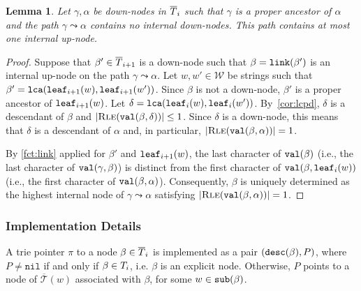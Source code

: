 \documentclass[a4paper]{article}
\newtheorem{lemma}[theorem]{Lemma}
\theoremstyle{remark}
\newcommand{\rle}{\textsc{Rle}}
\newcommand{\ustree}{\mathcal{\overline{T}}}
\newcommand{\coll}{\mathcal{W}}
\newcommand{\itnil}{\mathtt{nil}}
\begin{document}
\begin{lemma}\label{lem:oneup}
Let $\gamma,\alpha$ be down-nodes in $\overline{T}_i$ such that $\gamma$ is a proper ancestor of $\alpha$
and the path $\gamma \leadsto \alpha$ contains no internal down-nodes.
This path contains at most one internal up-node.
\end{lemma}
\begin{proof}
Suppose that $\beta'\in \overline{T}_{i+1}$ is a down-node such that $\beta=\mathtt{link}(\beta')$
is an internal up-node on the path $\gamma \leadsto \alpha$.
Let $w,w'\in \coll$ be strings such that $\beta' = \mathtt{lca}(\mathtt{leaf}_{i+1}(w),\mathtt{leaf}_{i+1}(w'))$.
Since $\beta$ is not a down-node, $\beta'$ is a proper ancestor of $\mathtt{leaf}_{i+1}(w)$.
Let $\delta = \mathtt{lca}(\mathtt{leaf}_{i}(w),\mathtt{leaf}_{i}(w'))$. By~\cref{cor:lcpd},
$\delta$ is a descendant of $\beta$ and $|\rle(\tval(\beta,\delta))|\le 1$.
Since $\delta$ is a down-node, this means that $\delta$ is a descendant of $\alpha$
and, in particular, $|\rle(\tval(\beta,\alpha))|=1$.

By \cref{fct:link} applied for $\beta'$ and $\mathtt{leaf}_{i+1}(w)$, the last character of $\mathtt{val}(\beta)$
(i.e., the last character of $\mathtt{val}(\gamma,\beta)$)
is distinct from the first character of $\mathtt{val}(\beta,\mathtt{leaf}_{i}(w))$ (i.e., the first character of $\mathtt{val}(\beta,\alpha)$).
Consequently, $\beta$ is uniquely determined as the highest internal node of $\gamma \leadsto \alpha$
satisfying $|\rle(\tval(\beta,\alpha))|=1$.
\end{proof}



\subsubsection{Implementation Details}

A trie pointer $\pi$ to a node $\beta\in\overline{T}_i$ is implemented as a pair $(\mathtt{desc}(\beta),P)$,
where $P\neq\itnil$ if and only if $\beta\in T_i$, i.e. $\beta$ is an explicit node.
Otherwise, $P$ points to a node of $\ustree(w)$ associated with $\beta$, for some $w\in\mathtt{sub}(\beta)$.
\end{document}
